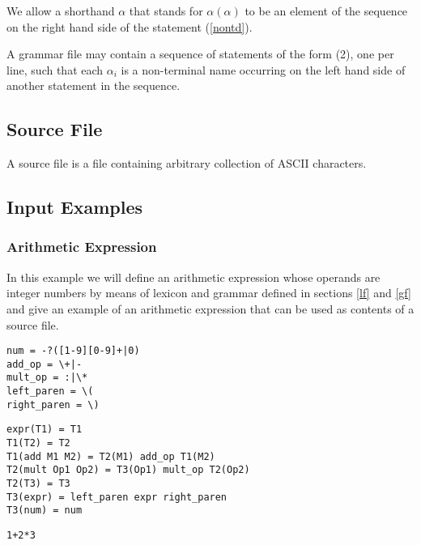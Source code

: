\documentclass[a4paper,10pt]{article}
\newcounter{subsubsubsection}[subsubsection]
\begin{document}
We allow a shorthand $\alpha$ that stands for $\alpha(\alpha)$ to be an element of the sequence on the right hand side of the statement (\ref{nontd}). 

A grammar file may contain a sequence of statements of the form (2), one per line, such that
 each $\alpha_i$ is a  non-terminal  name occurring on the left hand side of another statement in the sequence.



\subsection{Source File}\label{sf}
A source file is a file containing arbitrary collection of ASCII characters.

\subsection{Input Examples}\label{ie}
\subsubsection{Arithmetic Expression}
In this example we will define an arithmetic expression whose operands are integer numbers  by means of lexicon and grammar defined in sections \ref{lf} and \ref{gf} and give an example of an arithmetic expression that can be used as contents of a source file.

\label{alex}
\begin{verbatim}
num = -?([1-9][0-9]+|0)
add_op = \+|-
mult_op = :|\*
left_paren = \(
right_paren = \)
\end{verbatim} 
\label{agram}

\begin{verbatim}
expr(T1) = T1
T1(T2) = T2
T1(add M1 M2) = T2(M1) add_op T1(M2)
T2(mult Op1 Op2) = T3(Op1) mult_op T2(Op2)
T2(T3) = T3
T3(expr) = left_paren expr right_paren
T3(num) = num   
\end{verbatim}
 
\label{asf}
\begin{verbatim}
1+2*3
\end{verbatim}
\end{document}
